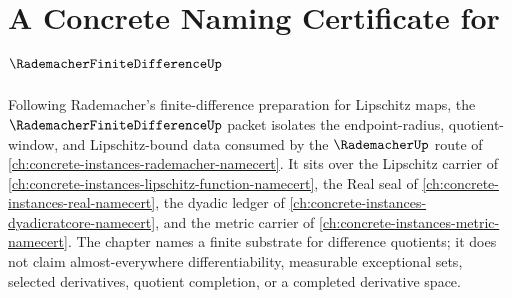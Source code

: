 \chapter{A Concrete Naming Certificate for $\RademacherFiniteDifferenceUp$}
\label{ch:concrete-instances-rademacher-finite-difference-namecert}

Following Rademacher's finite-difference preparation for Lipschitz maps, the $\RademacherFiniteDifferenceUp$ packet isolates the endpoint-radius, quotient-window, and Lipschitz-bound data consumed by the $\RademacherUp$ route of \autoref{ch:concrete-instances-rademacher-namecert}. It sits over the Lipschitz carrier of \autoref{ch:concrete-instances-lipschitz-function-namecert}, the Real seal of \autoref{ch:concrete-instances-real-namecert}, the dyadic ledger of \autoref{ch:concrete-instances-dyadicratcore-namecert}, and the metric carrier of \autoref{ch:concrete-instances-metric-namecert}. The chapter names a finite substrate for difference quotients; it does not claim almost-everywhere differentiability, measurable exceptional sets, selected derivatives, quotient completion, or a completed derivative space.


